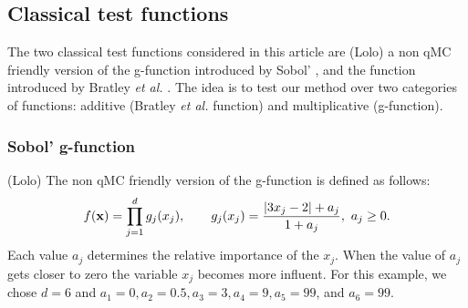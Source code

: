 \subsection{Classical test functions}
\label{sec:5.1}

The two classical test functions considered in this article are {\color{purple} (Lolo) a non qMC friendly version of the} g-function introduced by Sobol' \cite{Sobol'}, and the function introduced by Bratley \textit{et al.} \cite{Bratley}. The idea is to test our method over two categories of functions: additive (Bratley \textit{et al.} function) and multiplicative (g-function).

\subsubsection{Sobol' g-function}

{\color{purple} (Lolo)
The non qMC friendly version of the g-function is defined as follows:
\begin{equation*}
f(\boldsymbol{\mathbf{x}})= \prod \limits_{j=1}^{d}g_j(x_j), \qquad g_j(x_j)=\frac{\left |3x_j-2 \right | + a_j}{1 + a_j}, \ a_j \geq 0.
\end{equation*}}
Each value $a_j$ determines the relative importance of the $x_j$. When the value of $a_j$ gets closer to zero the variable $x_j$ becomes more influent. For this example, we chose $d=6$ and $a_1=0,a_2=0.5, a_3=3, a_4=9, a_5=99$, and $a_6=99$.


